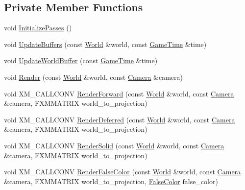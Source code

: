 \subsection*{Private Member Functions}
\begin{DoxyCompactItemize}
\item 
void \hyperlink{classmage_1_1rendering_1_1_renderer_1_1_impl_a0db15a325a2e2242a76323b27acec12f}{Initialize\+Passes} ()
\item 
void \hyperlink{classmage_1_1rendering_1_1_renderer_1_1_impl_acbf6274f82a95beac2543c8e642c309c}{Update\+Buffers} (const \hyperlink{classmage_1_1rendering_1_1_world}{World} \&world, const \hyperlink{classmage_1_1_game_time}{Game\+Time} \&time)
\item 
void \hyperlink{classmage_1_1rendering_1_1_renderer_1_1_impl_abe65d2d48affa6a7c83104944b4737d7}{Update\+World\+Buffer} (const \hyperlink{classmage_1_1_game_time}{Game\+Time} \&time)
\item 
void \hyperlink{classmage_1_1rendering_1_1_renderer_1_1_impl_af2d46a795175867592dc70e63c93967b}{Render} (const \hyperlink{classmage_1_1rendering_1_1_world}{World} \&world, const \hyperlink{classmage_1_1rendering_1_1_camera}{Camera} \&camera)
\item 
void X\+M\+\_\+\+C\+A\+L\+L\+C\+O\+NV \hyperlink{classmage_1_1rendering_1_1_renderer_1_1_impl_a42d47faf6879db3bc00190b9e626eef9}{Render\+Forward} (const \hyperlink{classmage_1_1rendering_1_1_world}{World} \&world, const \hyperlink{classmage_1_1rendering_1_1_camera}{Camera} \&camera, F\+X\+M\+M\+A\+T\+R\+IX world\+\_\+to\+\_\+projection)
\item 
void X\+M\+\_\+\+C\+A\+L\+L\+C\+O\+NV \hyperlink{classmage_1_1rendering_1_1_renderer_1_1_impl_add8f54938b1bd940a032e5165c60a09a}{Render\+Deferred} (const \hyperlink{classmage_1_1rendering_1_1_world}{World} \&world, const \hyperlink{classmage_1_1rendering_1_1_camera}{Camera} \&camera, F\+X\+M\+M\+A\+T\+R\+IX world\+\_\+to\+\_\+projection)
\item 
void X\+M\+\_\+\+C\+A\+L\+L\+C\+O\+NV \hyperlink{classmage_1_1rendering_1_1_renderer_1_1_impl_a39a9a77669ce1c2615f61806dd4f06e3}{Render\+Solid} (const \hyperlink{classmage_1_1rendering_1_1_world}{World} \&world, const \hyperlink{classmage_1_1rendering_1_1_camera}{Camera} \&camera, F\+X\+M\+M\+A\+T\+R\+IX world\+\_\+to\+\_\+projection)
\item 
void X\+M\+\_\+\+C\+A\+L\+L\+C\+O\+NV \hyperlink{classmage_1_1rendering_1_1_renderer_1_1_impl_aecb98e030f5486bbd31384af5b6e77b0}{Render\+False\+Color} (const \hyperlink{classmage_1_1rendering_1_1_world}{World} \&world, const \hyperlink{classmage_1_1rendering_1_1_camera}{Camera} \&camera, F\+X\+M\+M\+A\+T\+R\+IX world\+\_\+to\+\_\+projection, \hyperlink{namespacemage_1_1rendering_a6c3d1f4e7a5ae72dc07226e971205534}{False\+Color} false\+\_\+color)

\end{DoxyCompactItemize}
